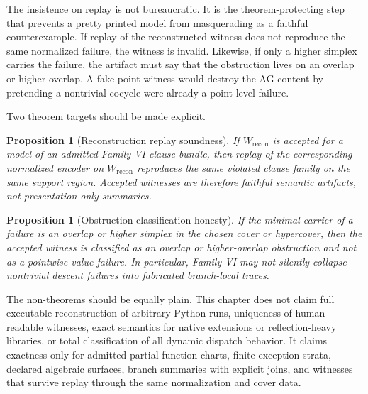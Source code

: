 \documentclass[11pt]{report}
\newtheorem{proposition}[definition]{Proposition}
\begin{document}
The insistence on replay is not bureaucratic. It is the theorem-protecting step that prevents a pretty printed model from masquerading as a faithful counterexample. If replay of the reconstructed witness does not reproduce the same normalized failure, the witness is invalid. Likewise, if only a higher simplex carries the failure, the artifact must say that the obstruction lives on an overlap or higher overlap. A fake point witness would destroy the AG content by pretending a nontrivial cocycle were already a point-level failure.

Two theorem targets should be made explicit.

\begin{proposition}[Reconstruction replay soundness]
If $W_{\mathrm{recon}}$ is accepted for a model of an admitted Family-VI clause bundle, then replay of the corresponding normalized encoder on $W_{\mathrm{recon}}$ reproduces the same violated clause family on the same support region. Accepted witnesses are therefore faithful semantic artifacts, not presentation-only summaries.
\end{proposition}

\begin{proposition}[Obstruction classification honesty]
If the minimal carrier of a failure is an overlap or higher simplex in the chosen cover or hypercover, then the accepted witness is classified as an overlap or higher-overlap obstruction and not as a pointwise value failure. In particular, Family VI may not silently collapse nontrivial descent failures into fabricated branch-local traces.
\end{proposition}

The non-theorems should be equally plain. This chapter does not claim full executable reconstruction of arbitrary Python runs, uniqueness of human-readable witnesses, exact semantics for native extensions or reflection-heavy libraries, or total classification of all dynamic dispatch behavior. It claims exactness only for admitted partial-function charts, finite exception strata, declared algebraic surfaces, branch summaries with explicit joins, and witnesses that survive replay through the same normalization and cover data.
\end{document}
